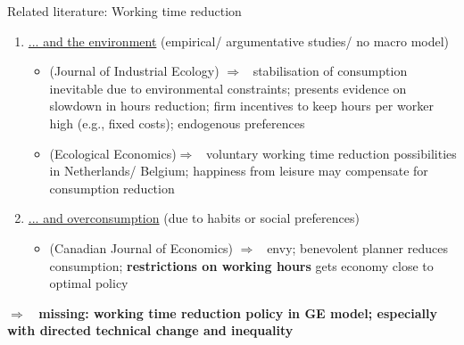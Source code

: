 \documentclass[11pt,aspectratio=169]{beamer}
\newcommand{\ar}{$\Rightarrow$ \ }
\begin{document}
\begin{frame}{Related literature: Working time reduction}
	\vspace{-2mm}
\begin{enumerate}
\item \underline{... and the environment} (empirical/ argumentative studies/ no macro model)
\begin{itemize}
\item \cite{Schor2005SustainableReduction}(Journal of Industrial Ecology) \ar stabilisation of consumption inevitable due to environmental constraints;  presents evidence on slowdown in hours reduction; firm incentives to keep hours per worker high (e.g., fixed costs); endogenous preferences
\vspace{2mm}
\item \cite{Pullinger2014WorkingDesign}(Ecological Economics)\ar voluntary working time reduction possibilities in Netherlands/ Belgium; happiness from leisure may compensate for consumption reduction%
\end{itemize}
\vspace{2mm}
\item \underline{... and overconsumption} (due to habits or social preferences)
\begin{itemize}
\item \cite{Alvarez-Cuadrado2007EnvyHours}(Canadian Journal of Economics) \ar envy; benevolent planner reduces consumption; \textbf{restrictions on working hours} gets economy close to optimal policy
\end{itemize}
\end{enumerate}
\vspace{-1mm}
\centering
\textbf{\alert{\ar missing: working time reduction policy in GE model; especially with directed technical change and inequality}
}
\end{frame}
\end{document}

